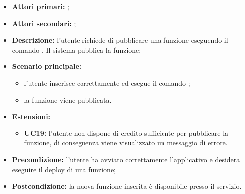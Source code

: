 \begin{itemize}
	\item \textbf{Attori primari:} \us{};
	\item \textbf{Attori secondari:} \re{};
	\item \textbf{Descrizione:} l’utente richiede di pubblicare una funzione eseguendo il comando \pdeploy{}. Il sistema pubblica la funzione; 
	\item \textbf{Scenario principale:} 
	\begin{itemize}
		\item l'utente inserisce correttamente ed esegue il comando \pdeploy{};
		\item la funzione viene pubblicata. 
	\end{itemize}
	\item \textbf{Estensioni:} 
	\begin{itemize}
		\item \textbf{UC19:} l’utente non dispone di credito sufficiente per pubblicare la funzione, di conseguenza viene visualizzato un messaggio di errore. 
	\end{itemize}
	\item \textbf{Precondizione:} l’utente ha avviato correttamente l’applicativo e desidera eseguire il deploy di una funzione; 
	\item \textbf{Postcondizione:} la nuova funzione inserita è disponibile presso il servizio. 
\end{itemize}